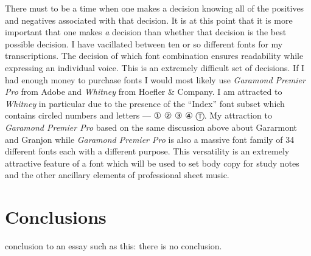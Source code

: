 \documentclass[nofonts,nobib]{tufte-handout}
\begin{document}
There must to be a time when one makes a decision knowing all of the positives
and negatives associated with that decision. It is at this point that it is
more important that one makes \emph{a} decision than whether that decision is
the best possible decision. I have vacillated between ten or so different
fonts for my transcriptions. The decision of which font combination ensures
readability while expressing an individual voice. This is an extremely
difficult set of decisions. If I had enough money to purchase fonts I would
most likely use \emph{Garamond Premier Pro} from Adobe and \emph{Whitney} from
Hoefler \& Company.\autocites{garamondPremier,hoeflerWhitney} I am attracted
to \emph{Whitney} in particular due to the presence of the ``Index'' font
subset which contains circled numbers and letters --- {\symbolfont① ② ③ ④
  Ⓣ}. My attraction to \emph{Garamond Premier Pro} based on the same
discussion above about Gararmont and Granjon while \emph{Garamond Premier Pro}
is also a massive font family of 34 different fonts each with a different
purpose. This versatility is an extremely attractive feature of a font which
will be used to set body copy for study notes and the other ancillary elements
of professional sheet music.

\section{Conclusions}
\label{sec:conclusions}

 conclusion to an essay such as this: there
is no conclusion. 
\nocite{adamRafferty}
\nocite{alexAnderson}
\nocite{alexDeGrassi}
\nocite{andrewWhite}
\nocite{andyMcKee}
\nocite{billyMcLaughlin}
\nocite{calumGraham,cliveCarroll,craigDAndrea,evaAtmatzidou,ewanDobson,garethPearson,happyTraum,ianEthanCase,janetFeder,jimmyWahlsteen,jonGomm,kakiKing,kellyValleau,kevinHorrigan,leoKottke,lucaStricagnoli,lucasMich,masaakiKishibe,michaelChap,michaelGul,mikeDawes,murielAnders,peppino,peterCiluzzi,peterFinger,pierre,rayMontford,pino,spencerElliot,sunghaJung,thomasLeeb,timSparks,tommyEmmanuel,trevorGH,vickiGenfan}
% 
% 
\printbibliography
\end{document}
